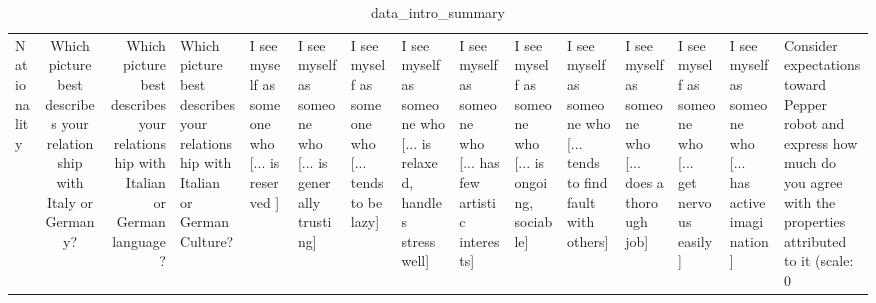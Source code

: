 \begin{table}
\caption{data_intro_summary}
\label{tab:data_intro_summary}
\begin{tabular}{lcr}
\toprule
Nationality & Which picture best describes your relationship with Italy or Germany? & Which picture best describes your relationship with Italian or German language? & Which picture best describes your relationship with Italian or German Culture? & I see myself as someone who  [... is reserved ] & I see myself as someone who  [... is generally trusting] & I see myself as someone who  [... tends to be lazy] & I see myself as someone who  [... is relaxed, handles stress well] & I see myself as someone who  [... has few artistic interests] & I see myself as someone who  [... is ongoing, sociable] & I see myself as someone who  [... tends to find fault with others] & I see myself as someone who  [... does a thorough job] & I see myself as someone who  [... get nervous easily] & I see myself as someone who  [... has active imagination] & Consider expectations toward Pepper robot and express how much do you agree with the properties attributed to it (scale: 0%
\end{tabular}
\end{table}
